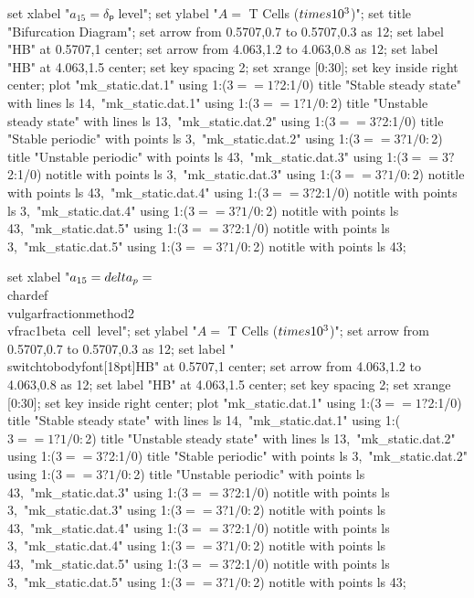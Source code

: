  set xlabel "$a_{15} = δₚ$ level";
  set ylabel "$A = $ T Cells ($\\times 10^3$)";
  set title "Bifurcation Diagram";
  set arrow from 0.5707,0.7 to 0.5707,0.3 as 12;
  set label "HB" at 0.5707,1 center;
  set arrow from 4.063,1.2 to 4.063,0.8 as 12;
  set label "HB" at 4.063,1.5 center;
  set key spacing 2;
  set xrange [0:30];
  set key inside right center;
  plot "mk_static.dat.1" using 1:($3==1?$2:1/0) title "Stable steady state" with lines ls 14,\
       "mk_static.dat.1" using 1:($3==1?1/0:$2) title "Unstable steady state" with lines ls 13,\
       "mk_static.dat.2" using 1:($3==3?$2:1/0) title "Stable periodic" with points ls 3,\
       "mk_static.dat.2" using 1:($3==3?1/0:$2) title "Unstable periodic" with points ls 43,\
       "mk_static.dat.3" using 1:($3==3?$2:1/0) notitle with points ls 3,\
       "mk_static.dat.3" using 1:($3==3?1/0:$2) notitle with points ls 43,\
       "mk_static.dat.4" using 1:($3==3?$2:1/0) notitle with points ls 3,\
       "mk_static.dat.4" using 1:($3==3?1/0:$2) notitle with points ls 43,\
       "mk_static.dat.5" using 1:($3==3?$2:1/0) notitle with points ls 3,\
       "mk_static.dat.5" using 1:($3==3?1/0:$2) notitle with points ls 43;
\stopGNUPLOTscript

\startGNUPLOTscript[bifurcation_xpp_simple]
  set xlabel "$a_{15} = \\delta_p = $\\chardef\\vulgarfractionmethod2\\vfrac1{beta~cell~level}";
  set ylabel "$A = $ T Cells ($\\times 10^3$)";
  set arrow from 0.5707,0.7 to 0.5707,0.3 as 12;
  set label "\\switchtobodyfont[18pt]HB" at 0.5707,1 center;
  set arrow from 4.063,1.2 to 4.063,0.8 as 12;
  set label "HB" at 4.063,1.5 center;
  set key spacing 2;
  set xrange [0:30];
  set key inside right center;
  plot "mk_static.dat.1" using 1:($3==1?$2:1/0) title "Stable steady state" with lines ls 14,\
       "mk_static.dat.1" using 1:($3==1?1/0:$2) title "Unstable steady state" with lines ls 13,\
       "mk_static.dat.2" using 1:($3==3?$2:1/0) title "Stable periodic" with points ls 3,\
       "mk_static.dat.2" using 1:($3==3?1/0:$2) title "Unstable periodic" with points ls 43,\
       "mk_static.dat.3" using 1:($3==3?$2:1/0) notitle with points ls 3,\
       "mk_static.dat.3" using 1:($3==3?1/0:$2) notitle with points ls 43,\
       "mk_static.dat.4" using 1:($3==3?$2:1/0) notitle with points ls 3,\
       "mk_static.dat.4" using 1:($3==3?1/0:$2) notitle with points ls 43,\
       "mk_static.dat.5" using 1:($3==3?$2:1/0) notitle with points ls 3,\
       "mk_static.dat.5" using 1:($3==3?1/0:$2) notitle with points ls 43;
\stopGNUPLOTscript

